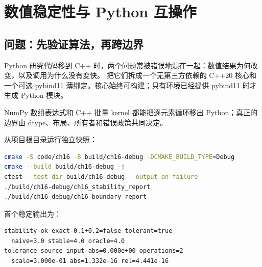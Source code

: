 \chapter{数值稳定性与 Python 互操作}


\section{问题：先验证算法，再跨边界}

Python 研究代码移到 C++ 时，两个问题常被错误地混在一起：数值结果为何改变，以及调用为什么没有变快。 把它们拆成一个无第三方依赖的 C++20 核心和一个可选 pybind11 薄绑定。核心始终可构建；只有环境已经提供 pybind11 时才生成 Python 模块。

\begin{pythonbridge}
NumPy 数组表达式和 C++ 批量 kernel 都能把逐元素循环移出 Python；真正的边界由 dtype、布局、所有者和错误政策共同决定。
\end{pythonbridge}

从项目根目录运行独立快照：

\begin{lstlisting}[language=bash,numbers=none]
cmake -S code/ch16 -B build/ch16-debug -DCMAKE_BUILD_TYPE=Debug
cmake --build build/ch16-debug -j
ctest --test-dir build/ch16-debug --output-on-failure
./build/ch16-debug/ch16_stability_report
./build/ch16-debug/ch16_boundary_report
\end{lstlisting}

首个稳定输出为：

\begin{lstlisting}[numbers=none]
stability-ok exact-0.1+0.2=false tolerant=true
  naive=3.0 stable=4.0 oracle=4.0
tolerance-source input-abs=0.000e+00 operations=2
  scale=3.000e-01 abs=1.332e-16 rel=4.441e-16
\end{lstlisting}

